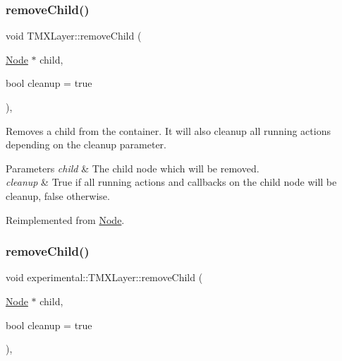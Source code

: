 \subsubsection{\texorpdfstring{remove\+Child()}{removeChild()}\hspace{0.1cm}{\footnotesize\ttfamily [1/2]}}
{\footnotesize\ttfamily void T\+M\+X\+Layer\+::remove\+Child (\begin{DoxyParamCaption}\item[{\hyperlink{classNode}{Node} $\ast$}]{child,  }\item[{bool}]{cleanup = {\ttfamily true} }\end{DoxyParamCaption})\hspace{0.3cm}{\ttfamily [override]}, {\ttfamily [virtual]}}

Removes a child from the container. It will also cleanup all running actions depending on the cleanup parameter.


\begin{DoxyParams}{Parameters}
{\em child} & The child node which will be removed. \\
\hline
{\em cleanup} & True if all running actions and callbacks on the child node will be cleanup, false otherwise. \\
\hline
\end{DoxyParams}


Reimplemented from \hyperlink{classNode_a872d4a7d389b26b0c6ad7ed99c8b1b65}{Node}.

\mbox{\label{classexperimental_1_1TMXLayer_a13544208580495a457a7ec1f2da9a4d1}} 
\subsubsection{\texorpdfstring{remove\+Child()}{removeChild()}\hspace{0.1cm}{\footnotesize\ttfamily [2/2]}}
{\footnotesize\ttfamily void experimental\+::\+T\+M\+X\+Layer\+::remove\+Child (\begin{DoxyParamCaption}\item[{\hyperlink{classNode}{Node} $\ast$}]{child,  }\item[{bool}]{cleanup = {\ttfamily true} }\end{DoxyParamCaption})\hspace{0.3cm}{\ttfamily [override]}, {\ttfamily [virtual]}}

